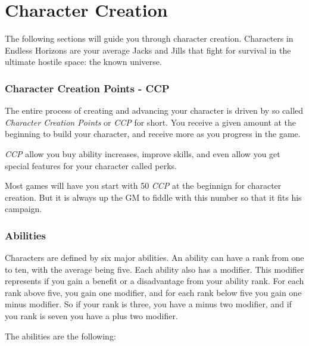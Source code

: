 \chapter{Character Creation}

The following sections will guide you through character creation. Characters
in Endless Horizons are your average Jacks and Jills that fight for survival
in the ultimate hostile space: the known universe.

\subsection{Character Creation Points - CCP}

The entire process of creating and advancing your character is driven by so
called \emph{Character Creation Points} or \emph{CCP} for short. You receive
a given amount at the beginning to build your character, and receive more as
you progress in the game.

\emph{CCP} allow you buy ability increases, improve skills, and even allow you
get special features for your character called perks.

Most games will have you start with 50 \emph{CCP} at the beginnign for character
creation. But it is always up the GM to fiddle with this number so that it fits
his campaign.

\subsection{Abilities}

Characters are defined by six major abilities. An ability can have a rank from
one to ten, with the average being five. Each ability also has a modifier. This
modifier represents if you gain a benefit or a disadvantage from your ability
rank. For each rank above five, you gain one modifier, and for each rank below
five you gain one minus modifier. So if your rank is three, you have a minus
two modifier, and if you rank is seven you have a plus two modifier.

The abilities are the following:

